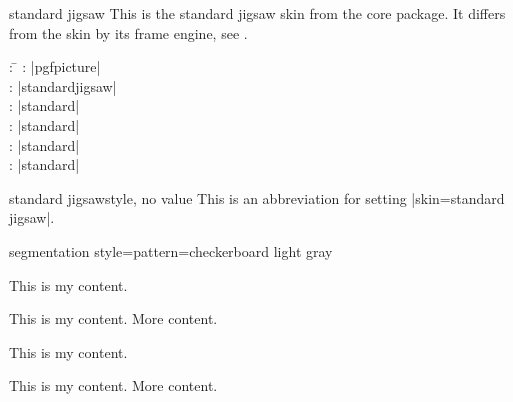 \begin{docSkin}{standard jigsaw}
  This is the standard jigsaw skin from the core package. It differs from
  the skin  by its frame engine, see .
\begin{tcolorbox}[skintable=standard jigsaw]
  \begin{tabbing}
    : \=\kill
    :  \> |pgfpicture|\\ 
    :           \> |standardjigsaw|\\
    : \> |standard|\\ 
    :        \> |standard|\\
    :    \> |standard|\\
    :           \> |standard|
  \end{tabbing}
\end{tcolorbox}
\end{docSkin}

\begin{docTcbKey}{standard jigsaw}{}{style, no value}
  This is an abbreviation for setting |skin=standard jigsaw|.
\end{docTcbKey}

\begin{dispExample*}{segmentation style={pattern=checkerboard light gray}}
\begin{tcbraster}[standard jigsaw,raster equal height,raster columns=4,
    colback=LightGreen,colframe=DarkGreen,colbacktitle=LimeGreen!75!DarkGreen,
    opacityframe=0.5,opacityback=0.5,opacitybacktitle=0.5,
    left=1mm,right=1mm,top=1mm,bottom=1mm,middle=1mm]
  \begin{tcolorbox}
    This is my content.
  \end{tcolorbox}
  \begin{tcolorbox}
    This is my content.
    \tcblower
    More content.
  \end{tcolorbox}
  \begin{tcolorbox}[adjusted title=My title]
    This is my content.
  \end{tcolorbox}
  \begin{tcolorbox}[adjusted title=My title]
    This is my content.
    \tcblower
    More content.
  \end{tcolorbox}
\end{tcbraster}
\end{dispExample*}


